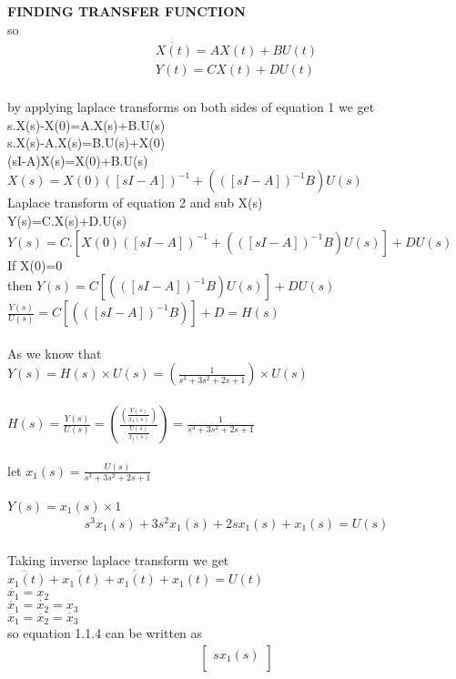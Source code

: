 \begin{enumerate}[label=\thesection.\arabic*.,ref=\thesection.\theenumi]
 \textbf{FINDING TRANSFER FUNCTION}
\\so
\begin{align}
 \dot{X(t)}=AX(t)+BU(t) \\
 Y(t)=CX(t)+DU(t)
\end{align}    
\\by applying laplace transforms on both sides of equation 1
we get
\\s.X(s)-X(0)=A.X(s)+B.U(s)
\\s.X(s)-A.X(s)=B.U(s)+X(0)
\\(sI-A)X(s)=X(0)+B.U(s)
\\$X(s)=X(0)([sI-A])^{-1}+(([sI-A])^{-1}B)U(s)$
\\Laplace transform of equation 2 and sub X(s) 
\\Y(s)=C.X(s)+D.U(s)
\\$Y(s)=C.[X(0)([sI-A])^{-1 }+ (([sI-A])^{-1}B)U(s)]+DU(s)$
\\If X(0)=0
\\then $Y(s)=C[(([sI-A])^{-1}B)U(s)]+DU(s)$
\\$\frac{Y(s)}{U(s)}=C[(([sI-A])^{-1}B)]+D=H(s)$
\\
\\ As we know that
\\ $Y(s)=H(s) \times U(s)= (\frac{1}{s^3+3s^2+2s+1}) \times U(s) $
\\
\\ $H(s)=\frac{Y(s)}{U(s)}=(\frac{(\frac{Y(s)}{x_{1}(s)})}{\frac{U(s)}{x_{1}(s)}})=\frac{1}{s^3+3s^2+2s+1} $
\\
\\let   $x_{1}(s)=\frac{U(s)}{s^3+3s^2+2s+1}$
\\
\\$Y(s)=x_{1}(s)\times 1 $
\begin{align}
s^3x_{1}(s)+3s^2x_{1}(s)+2sx_{1}(s)+x_{1}(s)=U(s)
\end{align}
\\ Taking inverse laplace transform we get
\\$\dddot{x_{1}(t)}+\ddot{x_{1}(t)}+\dot{x_{1}(t)}+x_{1}(t)=U(t)$
\\$\dot{x_{1}}=x_{2}$
\\$\ddot{x_{1}}=\dot{x_{2}}=x_{3}$
\\$\dddot{x_{1}}=\ddot{x_{2}}=\dot{x_{3}}$
\\ so equation 1.1.4 can be written as
\\
\begin{gather}
\begin{bmatrix}
sx_{1}(s)\\

\end{bmatrix}
\end{gather}
\end{enumerate}

